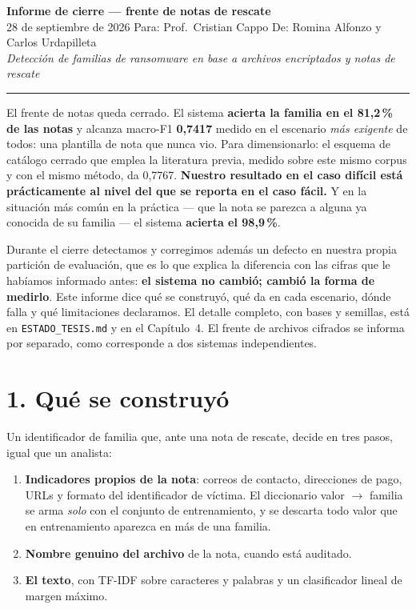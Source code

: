 \documentclass[11pt,a4paper]{article}
\begin{document}
\begin{center}
{\large\bfseries Informe de cierre --- frente de notas de rescate}\\[6pt]
{\small 28 de septiembre de 2026 \quad\textbullet\quad Para: Prof.\ Cristian Cappo \quad\textbullet\quad
De: Romina Alfonzo y Carlos Urdapilleta}\\[4pt]
{\footnotesize\itshape Detección de familias de ransomware en base a archivos encriptados
y notas de rescate}
\end{center}

\vspace{0.3em}
\hrule
\vspace{0.9em}

El frente de notas queda cerrado. El sistema \textbf{acierta la familia en el 81,2\,\% de las notas}
y alcanza macro-F1 \textbf{0,7417} medido en el escenario \emph{más exigente} de todos: una plantilla
de nota que nunca vio. Para dimensionarlo: el esquema de catálogo cerrado que emplea la literatura
previa, medido sobre este mismo corpus y con el mismo método, da 0,7767. \textbf{Nuestro resultado en
el caso difícil está prácticamente al nivel del que se reporta en el caso fácil.} Y en la situación
más común en la práctica --- que la nota se parezca a alguna ya conocida de su familia --- el sistema
\textbf{acierta el 98,9\,\%}.

Durante el cierre detectamos y corregimos además un defecto en nuestra propia partición de
evaluación, que es lo que explica la diferencia con las cifras que le habíamos informado antes:
\textbf{el sistema no cambió; cambió la forma de medirlo}. Este informe dice qué se construyó, qué da
en cada escenario, dónde falla y qué limitaciones declaramos. El detalle completo, con bases y semillas, está en
\texttt{ESTADO\_TESIS.md} y en el Capítulo~4. El frente de archivos cifrados se informa por
separado, como corresponde a dos sistemas independientes.

\section*{1. Qué se construyó}

Un identificador de familia que, ante una nota de rescate, decide en tres pasos, igual que un
analista:

\begin{enumerate}\setlength{\itemsep}{0.15em}
  \item \textbf{Indicadores propios de la nota}: correos de contacto, direcciones de pago, URLs y
        formato del identificador de víctima. El diccionario valor $\rightarrow$ familia se arma
        \emph{solo} con el conjunto de entrenamiento, y se descarta todo valor que en entrenamiento
        aparezca en más de una familia.
  \item \textbf{Nombre genuino del archivo} de la nota, cuando está auditado.
  \item \textbf{El texto}, con TF-IDF sobre caracteres y palabras y un clasificador lineal de
        margen máximo.
\end{enumerate}
\end{document}
